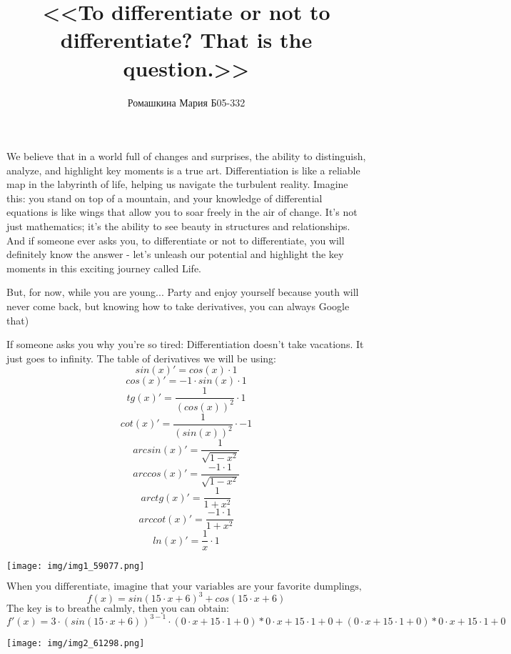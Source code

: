 \documentclass{article}
\title{<<To differentiate or not to differentiate? That is the question.>>}
\author{Ромашкина Мария Б05-332}
\begin{document}
\maketitle
\newpage
We believe that in a world full of changes and surprises, the ability to distinguish,                   analyze, and highlight key moments is a true art. Differentiation is like a reliable map in the labyrinth of life,                   helping us navigate the turbulent reality. Imagine this: you stand on top of a mountain,                   and your knowledge of differential equations is like wings that allow you to soar freely in the air of change.                   It's not just mathematics; it's the ability to see beauty in structures and relationships. And if someone ever asks you,                   to differentiate or not to differentiate, you will definitely know the answer -                   let's unleash our potential and highlight the key moments in this exciting journey called Life.

But, for now, while you are young...                   Party and enjoy yourself because youth will never come back,                   but knowing how to take derivatives, you can always Google that)

If someone asks you why you're so tired:                   Differentiation doesn't take vacations. It just goes to infinity.
The table of derivatives we will be using:
$$sin(x)' =  cos( x ) \cdot 1 $$
$$cos(x)' =  -1 \cdot sin( x ) \cdot 1 $$
$$tg(x)' =  \frac { 1 } { ( cos( x ) ) ^ { 2 } } \cdot 1 $$
$$cot(x)' =  \frac { 1 } { ( sin( x ) ) ^ { 2 } } \cdot -1 $$
$$arcsin(x)' =  \frac { 1 } { \sqrt{ 1 - x ^ { 2 } } } $$
$$arccos(x)' =  \frac { -1 \cdot 1 } { \sqrt{ 1 - x ^ { 2 } } } $$
$$arctg(x)' =  \frac { 1 } { 1 + x ^ { 2 } } $$
$$arccot(x)' =  \frac { -1 \cdot 1 } { 1 + x ^ { 2 } } $$
$$ln(x)' =  \frac { 1 } { x } \cdot 1 $$

\texttt{[image: img/img1\_59077.png]}

$
\text{When you differentiate, imagine that your variables are your favorite dumplings, and you're separating them to discover their secret recipe.}$
$$f(x) =  sin( 15 \cdot x + 6 ) ^ { 3 } + cos( 15 \cdot x + 6 ) $$
$
\text{The key is to breathe calmly, then you can obtain:}$
$$f'(x) =  3 \cdot ( sin( 15 \cdot x + 6 ) ) ^ { 3 - 1 } \cdot ( 0 \cdot x + 15 \cdot 1 + 0 ) * 0 \cdot x + 15 \cdot 1 + 0 + ( 0 \cdot x + 15 \cdot 1 + 0 ) * 0 \cdot x + 15 \cdot 1 + 0 $$

\texttt{[image: img/img2\_61298.png]}
\end{document}

